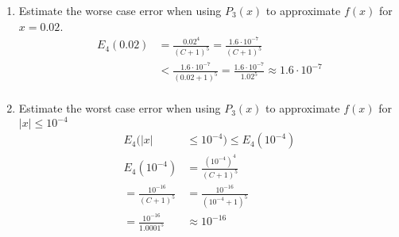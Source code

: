 \documentclass{article}
\begin{document}
\begin{enumerate}[label=(\alph*)]
    \item Estimate the worse case error when using \(P_3(x)\) to approximate \(f(x)\) for \(x = 0.02\).
          \begin{align*}
              E_{4}(0.02) & = \frac{0.02^4}{(C + 1)^5} = \frac{1.6 \cdot 10^{-7}}{(C + 1) ^ 5}                                        \\
                          & < \frac{1.6 \cdot 10^{-7}}{(0.02 + 1) ^ 5} = \frac{1.6 \cdot 10^{-7}}{1.02 ^ 5} \approx 1.6 \cdot 10^{-7} \\
          \end{align*}
    \item Estimate the worst case error when using \(P_3(x)\) to approximate \(f(x)\) for \(\vert x \vert \leq 10^{-4}\)
          \begin{align*}
              E_4(\vert x \vert             & \leq 10^{-4}) \leq E_4(10^{-4})    \\
              E_4(10^{-4})                  & = \frac{(10^{-4})^4}{(C + 1)^5}    \\
              = \frac{10^{-16}}{(C + 1)^5}  & = \frac{10^{-16}}{(10^{-4} + 1)^5} \\
              = \frac{10^{-16}}{1.0001 ^ 5} & \approx 10^{-16}                   \\
          \end{align*}
\end{enumerate}
\end{document}
